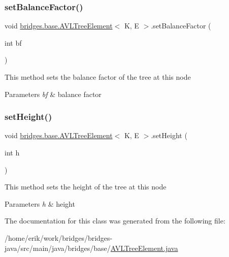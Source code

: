 \subsubsection{\texorpdfstring{set\+Balance\+Factor()}{setBalanceFactor()}}
{\footnotesize\ttfamily void \hyperlink{classbridges_1_1base_1_1_a_v_l_tree_element}{bridges.\+base.\+A\+V\+L\+Tree\+Element}$<$ K, E $>$.set\+Balance\+Factor (\begin{DoxyParamCaption}\item[{int}]{bf }\end{DoxyParamCaption})}

This method sets the balance factor of the tree at this node


\begin{DoxyParams}{Parameters}
{\em bf} & balance factor \\
\hline
\end{DoxyParams}
\mbox{\label{classbridges_1_1base_1_1_a_v_l_tree_element_ac42b744989ed7e18dcbd52980e674b33}} 
\subsubsection{\texorpdfstring{set\+Height()}{setHeight()}}
{\footnotesize\ttfamily void \hyperlink{classbridges_1_1base_1_1_a_v_l_tree_element}{bridges.\+base.\+A\+V\+L\+Tree\+Element}$<$ K, E $>$.set\+Height (\begin{DoxyParamCaption}\item[{int}]{h }\end{DoxyParamCaption})}

This method sets the height of the tree at this node


\begin{DoxyParams}{Parameters}
{\em h} & height \\
\hline
\end{DoxyParams}


The documentation for this class was generated from the following file\+:\begin{DoxyCompactItemize}
\item 
/home/erik/work/bridges/bridges-\/java/src/main/java/bridges/base/\hyperlink{_a_v_l_tree_element_8java}{A\+V\+L\+Tree\+Element.\+java}\end{DoxyCompactItemize}
